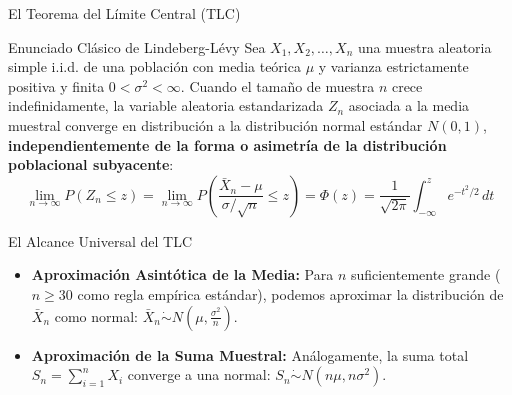 \documentclass[10pt, aspectratio=169]{beamer}
\begin{document}
\begin{frame}{El Teorema del Límite Central (TLC)}
  \fontsize{7.5pt}{9pt}\selectfont
  \begin{block}{Enunciado Clásico de Lindeberg-Lévy}
    \fontsize{7.5pt}{9pt}\selectfont
    Sea $X_1, X_2, \ldots, X_n$ una muestra aleatoria simple i.i.d. de una población con media teórica $\mu$ y varianza estrictamente positiva y finita $0 < \sigma^2 < \infty$. Cuando el tamaño de muestra $n$ crece indefinidamente, la variable aleatoria estandarizada $Z_n$ asociada a la media muestral converge en distribución a la distribución normal estándar $N(0,1)$, \textbf{independientemente de la forma o asimetría de la distribución poblacional subyacente}:
    $$\lim_{n \to \infty} P\left(Z_n \le z\right) = \lim_{n \to \infty} P\left(\frac{\bar{X}_n - \mu}{\sigma / \sqrt{n}} \le z\right) = \Phi(z) = \frac{1}{\sqrt{2\pi}} \int_{-\infty}^{z} e^{-t^2/2} \, dt$$
  \end{block}
  \vspace{-0.15cm}
  \pause
  \begin{alertblock}{El Alcance Universal del TLC}
    \fontsize{7.5pt}{9pt}\selectfont
    \begin{itemize}\itemsep=0.08cm
      \item \textbf{Aproximación Asintótica de la Media:} Para $n$ suficientemente grande ($n \ge 30$ como regla empírica estándar), podemos aproximar la distribución de $\bar{X}_n$ como normal: $\bar{X}_n \dot{\sim} N\left(\mu, \frac{\sigma^2}{n}\right)$.
      \item \textbf{Aproximación de la Suma Muestral:} Análogamente, la suma total $S_n = \sum_{i=1}^n X_i$ converge a una normal: $S_n \dot{\sim} N(n\mu, n\sigma^2)$.
    \end{itemize}
  \end{alertblock}
\end{frame}
\end{document}
